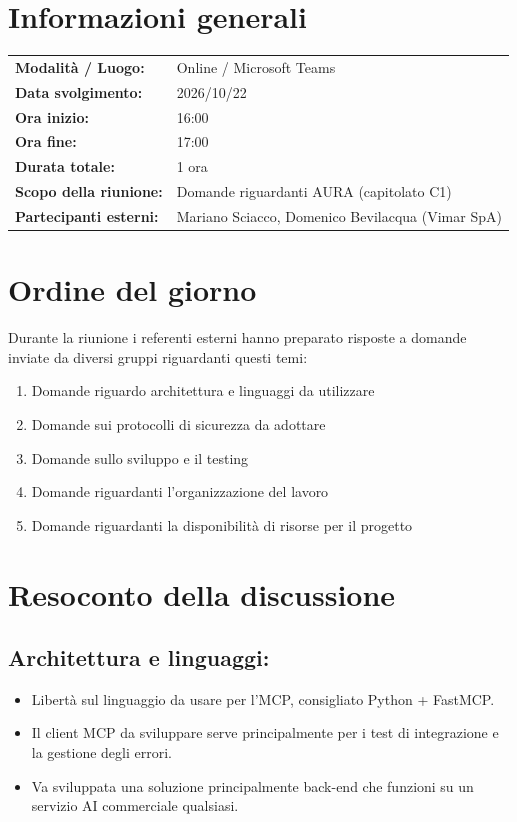 \documentclass[a4paper, 11pt]{article}
\begin{document}
\newpage
\tableofcontents
\newpage


\section{Informazioni generali}
\begin{tabularx}{\textwidth}{l X}
    \textbf{Modalità / Luogo:} & Online / Microsoft Teams \\
    \textbf{Data svolgimento:} & 2026/10/22 \\
    \textbf{Ora inizio:} & 16:00 \\
    \textbf{Ora fine:} & 17:00 \\
    \textbf{Durata totale:} & 1 ora \\
    \textbf{Scopo della riunione:} & Domande riguardanti AURA (capitolato C1) \\
    \textbf{Partecipanti esterni:} & Mariano Sciacco, Domenico Bevilacqua (Vimar SpA)
\end{tabularx}

\newpage


\section{Ordine del giorno}
Durante la riunione i referenti esterni hanno preparato risposte a domande inviate da diversi gruppi riguardanti questi temi:
\begin{enumerate}
    \item Domande riguardo architettura e linguaggi da utilizzare
    \item Domande sui protocolli di sicurezza da adottare
    \item Domande sullo sviluppo e il testing
    \item Domande riguardanti l'organizzazione del lavoro
    \item Domande riguardanti la disponibilità di risorse per il progetto
\end{enumerate}

\newpage


\section{Resoconto della discussione}

\subsection{Architettura e linguaggi:}
\begin{itemize}
    \item Libertà sul linguaggio da usare per l'MCP, consigliato Python + FastMCP. \vspace{-0.1cm}
    \item Il client MCP da sviluppare serve principalmente per i test di integrazione e la gestione degli errori. \vspace{-0.1cm}
    \item Va sviluppata una soluzione principalmente back-end che funzioni su un servizio AI commerciale qualsiasi. \vspace{-0.1cm}
\end{itemize}
\end{document}
